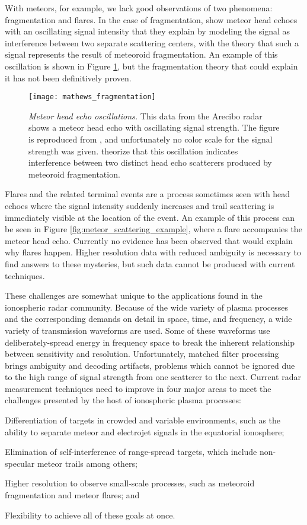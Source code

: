 With meteors, for example, we lack good observations of two phenomena: fragmentation and flares. In the case of fragmentation, \textcite{MBMC10} show meteor head echoes with an oscillating signal intensity that they explain by modeling the signal as interference between two separate scattering centers, with the theory that such a signal represents the result of meteoroid fragmentation. An example of this oscillation is shown in Figure \ref{fig:mathews_fragmentation}, but the fragmentation theory that could explain it has not been definitively proven.
\begin{figure}[tbp]
 \centering
 \texttt{[image: mathews\_fragmentation]}
 \caption[Meteor head echo oscillations]{\emph{Meteor head echo oscillations.} This data from the Arecibo radar shows a meteor head echo with oscillating signal strength. The figure is reproduced from \textcite{MBMC10}, and unfortunately no color scale for the signal strength was given. \textcite{MBMC10} theorize that this oscillation indicates interference between two distinct head echo scatterers produced by meteoroid fragmentation.}
 \label{fig:mathews_fragmentation}
\end{figure}
Flares and the related terminal events are a process sometimes seen with head echoes where the signal intensity suddenly increases and trail scattering is immediately visible at the location of the event. An example of this process can be seen in Figure \ref{fig:meteor_scattering_example}, where a flare accompanies the meteor head echo. Currently no evidence has been observed that would explain why flares happen. Higher resolution data with reduced ambiguity is necessary to find answers to these mysteries, but such data cannot be produced with current techniques.

These challenges are somewhat unique to the applications found in the ionospheric radar community. Because of the wide variety of plasma processes and the corresponding demands on detail in space, time, and frequency, a wide variety of transmission waveforms are used. Some of these waveforms use deliberately-spread energy in frequency space to break the inherent relationship between sensitivity and resolution. Unfortunately, matched filter processing brings ambiguity and decoding artifacts, problems which cannot be ignored due to the high range of signal strength from one scatterer to the next. Current radar measurement techniques need to improve in four major areas to meet the challenges presented by the host of ionospheric plasma processes:
\begin{inparaenum}[1)]
 \item Differentiation of targets in crowded and variable environments, such as the ability to separate meteor and electrojet signals in the equatorial ionosphere;
 \item Elimination of self-interference of range-spread targets, which include non-specular meteor trails among others;
 \item Higher resolution to observe small-scale processes, such as meteoroid fragmentation and meteor flares; and
 \item Flexibility to achieve all of these goals at once.
\end{inparaenum}

